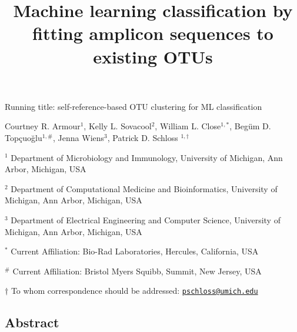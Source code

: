 \documentclass[
]{article}
\title{\textbf{Machine learning classification by fitting amplicon
sequences to existing OTUs}}
\author{}
\date{\vspace{-2.5em}}
\begin{document}
\maketitle

Running title: self-reference-based OTU clustering for ML classification

\vspace{10mm}

Courtney R. Armour\({^1}\), Kelly L. Sovacool\({^2}\), William L.
Close\(^{1,*}\), Begüm D. Topçuoğlu\(^{1,\#}\), Jenna Wiens\({^3}\),
Patrick D. Schloss \(^{1,\dagger}\)

\vspace{10mm}

\({^1}\) Department of Microbiology and Immunology, University of
Michigan, Ann Arbor, Michigan, USA

\({^2}\) Department of Computational Medicine and Bioinformatics,
University of Michigan, Ann Arbor, Michigan, USA

\({^3}\) Department of Electrical Engineering and Computer Science,
University of Michigan, Ann Arbor, Michigan, USA

\({^*}\) Current Affiliation: Bio-Rad Laboratories, Hercules,
California, USA

\({^\#}\) Current Affiliation: Bristol Myers Squibb, Summit, New Jersey,
USA

\(\dagger\) To whom correspondence should be addressed:
\href{mailto:pschloss@umich.edu}{\nolinkurl{pschloss@umich.edu}}

\newpage

\linenumbers

\hypertarget{abstract}{%
\subsection{Abstract}\label{abstract}}
\end{document}
